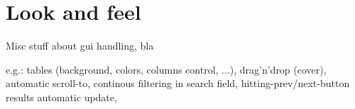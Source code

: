 % 
% 

\section{Look and feel}

Misc stuff about gui handling, bla

e.g.: tables (background, colors, columns control, ...),
      drag'n'drop (cover), automatic scroll-to, continous filtering in search field,
      hitting-prev/next-button results automatic update,
      